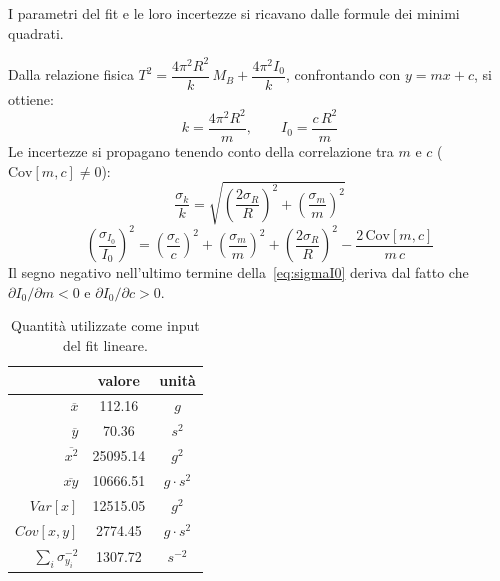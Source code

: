 \documentclass{article}
\begin{document}
I parametri del fit e le loro incertezze si ricavano dalle formule dei minimi quadrati.

Dalla relazione fisica $T^2 = \dfrac{4\pi^2 R^2}{k}\,M_B + \dfrac{4\pi^2 I_0}{k}$,
confrontando con $y = mx + c$, si ottiene:
\begin{equation}
    k = \frac{4\pi^2 R^2}{m}, \qquad I_0 = \frac{c\,R^2}{m}
    \label{eq:kI0}
\end{equation}
Le incertezze si propagano tenendo conto della correlazione tra $m$ e $c$
($\mathrm{Cov}[m,c] \neq 0$):
\begin{equation}
    \frac{\sigma_k}{k} = \sqrt{\left(\frac{2\sigma_R}{R}\right)^2 + \left(\frac{\sigma_m}{m}\right)^2}
    \label{eq:sigmaK}
\end{equation}
\begin{equation}
    \left(\frac{\sigma_{I_0}}{I_0}\right)^2 =
    \left(\frac{\sigma_c}{c}\right)^2
    + \left(\frac{\sigma_m}{m}\right)^2
    + \left(\frac{2\sigma_R}{R}\right)^2
    - \frac{2\,\mathrm{Cov}[m,c]}{m\,c}
    \label{eq:sigmaI0}
\end{equation}
Il segno negativo nell'ultimo termine della~\eqref{eq:sigmaI0} deriva dal fatto
che $\partial I_0/\partial m < 0$ e $\partial I_0/\partial c > 0$.

{\def\arraystretch{1.3}\tabcolsep=12pt
	\begin{table}[h!]
		\begin{center}
			\small
			\begin{tabular}{|r|c|c|}
				\hline
				 & valore & unit\`a \\ 
				\hline
				$\overline{x}$ & 112.16
                                & $g$  \\
                                \hline
				$\overline{y}$ & 70.36
                                & $s^2$  \\
                                \hline
				$\overline{x^2}$ & 25095.14
                                & $g^2$  \\
                                \hline
				$\overline{xy}$ & 10666.51
                                & $g \cdot s^2$  \\
                                \hline
				$Var[x]$ & 12515.05
                                & $g^2$  \\
                                \hline
				$Cov[x,y]$ & 2774.45
                                & $g \cdot s^2$  \\
                                \hline
				$\sum_i \sigma_{y_i}^{-2}$ & 1307.72
                                & $s^{-2}$ \\
                                \hline
                       \end{tabular}
		\end{center}
                  \begin{footnotesize}
		\caption{Quantit\`a utilizzate
                  come input del fit
                  lineare.}
                 \end{footnotesize}
		\label{tab5}
	\end{table}
}
\end{document}
